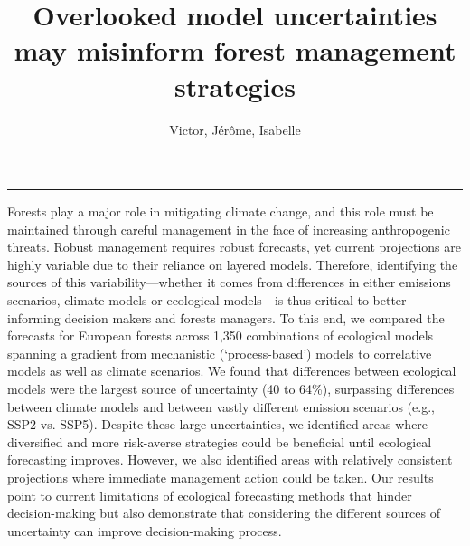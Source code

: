 \documentclass[11pt,letter]{article}
\begin{document}
\title{Overlooked model uncertainties may misinform forest management strategies
}

\author{Victor, Jérôme, Isabelle} %
\date{}
\maketitle 

\noindent\rule{\textwidth}{0.3pt}
Forests play a major role in mitigating climate change, and this role must be maintained through careful management in the face of increasing anthropogenic threats. Robust management requires robust forecasts, yet current projections are highly variable due to their reliance on layered models. Therefore, identifying the sources of this variability---whether it comes from differences in either emissions scenarios, climate models or ecological models---is thus critical to better informing decision makers and forests managers. To this end, we compared the forecasts for European forests across 1,350 combinations of ecological models spanning a gradient from mechanistic (`process-based') models to correlative models as well as climate scenarios. We found that differences between ecological models were the largest source of uncertainty (40 to 64\%), surpassing differences between climate models and between vastly different emission scenarios (e.g., SSP2 vs. SSP5). Despite these large uncertainties, we identified areas where diversified and more risk-averse strategies could be beneficial until ecological forecasting improves. However, we also identified areas with relatively consistent projections where immediate management action could be taken. Our results point to current limitations of ecological forecasting methods that hinder decision-making but also demonstrate that considering the different sources of uncertainty can improve decision-making process.
\end{document}
